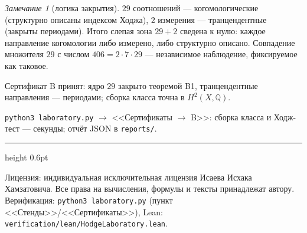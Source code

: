 \documentclass[11pt,a4paper]{article}
\theoremstyle{plain}
\theoremstyle{definition}
\theoremstyle{remark}
\newtheorem{remark}[theorem]{Замечание}
\newcommand{\QQ}{\mathbb{Q}}
\begin{document}
\begin{remark}[логика закрытия]
$29$ соотношений --- когомологические (структурно описаны индексом
Ходжа), $2$ измерения --- транцендентные (закрыты периодами).
Итого слепая зона $29+2$ сведена к нулю: каждое направление
когомологии либо измерено, либо структурно описано. Совпадение
множителя $29$ с числом $406=2\cdot7\cdot29$ --- независимое
наблюдение, фиксируемое как таковое.
\end{remark}

\begin{statusbox}[итог]
Сертификат B принят: ядро $29$ закрыто теоремой B1, транцендентные
направления --- периодами; сборка класса точна в $H^2(X,\QQ)$.
\end{statusbox}

\begin{verifybox}
\texttt{python3 laboratory.py} $\to$ <<Сертификаты $\to$ B>>:
сборка класса и Ходж-тест --- секунды; отчёт JSON в
\texttt{reports/}.
\end{verifybox}

\vfill
{\color{linkblue}\hrule height 0.6pt}
\vspace{0.5em}
{\small\color{gray}
Лицензия: индивидуальная исключительная лицензия Исаева Исхака Хамзатовича.
Все права на вычисления, формулы и тексты принадлежат автору.
Верификация: \texttt{python3 laboratory.py} (пункт <<Стенды>>/<<Сертификаты>>),
Lean: \texttt{verification/lean/HodgeLaboratory.lean}.
}
\end{document}

